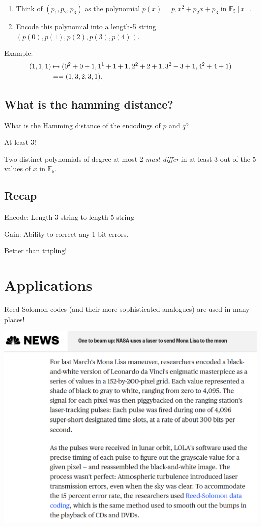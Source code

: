 \documentclass[11pt]{article}
\begin{document}
\begin{enumerate}
\item Think of \((p_1,p_2,p_3)\) as the polynomial \(p(x) = p_1 x^2 + p_2 x + p_3\) in \(\mathbb F_5[x]\).
\item Encode this polynomial into a length-5 string \((p(0),p(1),p(2),p(3),p(4))\).
\end{enumerate}

Example:
\begin{align*}
(1,1,1) &\mapsto {\small (0^2+0+1, 1^1+1+1, 2^2+2+1, 3^2+3+1, 4^2+4+1)} \\
&== (1,3,2,3,1).
\end{align*}

\subsection*{What is the hamming distance?}
\label{sec:org0ef4c14}
What is the Hamming distance of the encodings of \(p\) and \(q\)?

At least 3!

Two distinct polynomials of degree at most 2 \emph{must differ} in at least 3 out of the 5 values of \(x\) in \(\mathbb F_5\).

\subsection*{Recap}
\label{sec:orgde286e8}
Encode: Length-3 string to length-5 string

Gain: Ability to correct any 1-bit errors.

Better than tripling!

\section*{Applications}
\label{sec:org295af3c}
Reed-Solomon codes (and their more sophisticated analogues) are used in many places!

\begin{center}
\includegraphics[width=.9\linewidth]{news.png}
\end{center}
\end{document}
